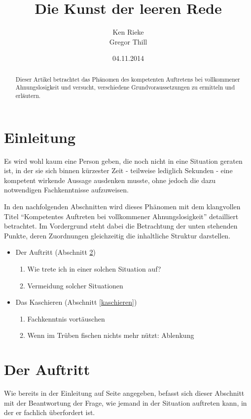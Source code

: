 \documentclass{article}
\begin{document}
\title{Die Kunst der leeren Rede}
\author{
  Ken Rieke\\
  Gregor Thill
}
\date{04.11.2014}
\maketitle
\begin{abstract}\label{abstract}
  Dieser Artikel betrachtet das Phänomen des kompetenten Auftretens bei
  vollkommener Ahnungslosigkeit und versucht, verschiedene Grundvoraussetzungen
  zu ermitteln und erläutern.
\end{abstract}

\section{Einleitung}\label{einleitung}
  Es wird wohl kaum eine Person geben, die noch nicht in eine Situation
  geraten ist, in der sie sich binnen kürzester Zeit - teilweise lediglich
  Sekunden - eine kompetent wirkende Aussage ausdenken musste, ohne jedoch die
  dazu notwendigen Fachkenntnisse aufzuweisen.

  In den nachfolgenden Abschnitten wird dieses Phänomen mit dem klangvollen
  Titel "`Kompetentes Auftreten bei vollkommener Ahnungslosigkeit"' detailliert
  betrachtet. Im Vordergrund steht dabei die Betrachtung der unten stehenden
  Punkte, deren Zuordnungen gleichzeitig die inhaltliche Struktur darstellen.

  \begin{itemize}
    \item Der Auftritt (Abschnitt \ref{auftritt})
    \begin{enumerate}
      \item Wie trete ich in einer solchen Situation auf?
      \item Vermeidung solcher Situationen
    \end{enumerate}
    \item Das Kaschieren (Abschnitt \ref{kaschieren})
    \begin{enumerate}
      \item Fachkenntnis vortäuschen
      \item Wenn im Trüben fischen nichts mehr nützt: Ablenkung
    \end{enumerate}
  \end{itemize}

\section{Der Auftritt}\label{auftritt}
  Wie bereits in der Einleitung auf Seite \pageref{einleitung} angegeben,
  befasst sich dieser Abschnitt mit der Beantwortung der Frage, wie jemand
  in der Situation auftreten kann, in der er fachlich überfordert ist.
\end{document}
